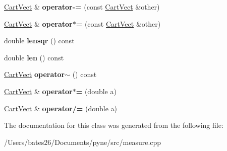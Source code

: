 \begin{DoxyCompactItemize}
\item 
\hypertarget{class_cart_vect_a459252305cedf4e95a997bd46a26e9b8}{\hyperlink{class_cart_vect}{Cart\+Vect} \& {\bfseries operator-\/=} (const \hyperlink{class_cart_vect}{Cart\+Vect} \&other)}\label{class_cart_vect_a459252305cedf4e95a997bd46a26e9b8}

\item 
\hypertarget{class_cart_vect_ae4d813aaf367f7260870b051062a776f}{\hyperlink{class_cart_vect}{Cart\+Vect} \& {\bfseries operator$\ast$=} (const \hyperlink{class_cart_vect}{Cart\+Vect} \&other)}\label{class_cart_vect_ae4d813aaf367f7260870b051062a776f}

\item 
\hypertarget{class_cart_vect_a9ab6e8cdf915cde3cf166a6c8c10ce17}{double {\bfseries lensqr} () const }\label{class_cart_vect_a9ab6e8cdf915cde3cf166a6c8c10ce17}

\item 
\hypertarget{class_cart_vect_a4809574b9b0bc24075da36e5b60e6988}{double {\bfseries len} () const }\label{class_cart_vect_a4809574b9b0bc24075da36e5b60e6988}

\item 
\hypertarget{class_cart_vect_aeafa9899c84e5ed65f3217fc1217e7a2}{\hyperlink{class_cart_vect}{Cart\+Vect} {\bfseries operator$\sim$} () const }\label{class_cart_vect_aeafa9899c84e5ed65f3217fc1217e7a2}

\item 
\hypertarget{class_cart_vect_a3dec977a311cf363e0ce7f2983370b10}{\hyperlink{class_cart_vect}{Cart\+Vect} \& {\bfseries operator$\ast$=} (double a)}\label{class_cart_vect_a3dec977a311cf363e0ce7f2983370b10}

\item 
\hypertarget{class_cart_vect_aaf0806de8642163882bc844e55fa921f}{\hyperlink{class_cart_vect}{Cart\+Vect} \& {\bfseries operator/=} (double a)}\label{class_cart_vect_aaf0806de8642163882bc844e55fa921f}

\end{DoxyCompactItemize}


The documentation for this class was generated from the following file\+:\begin{DoxyCompactItemize}
\item 
/\+Users/bates26/\+Documents/pyne/src/measure.\+cpp\end{DoxyCompactItemize}
